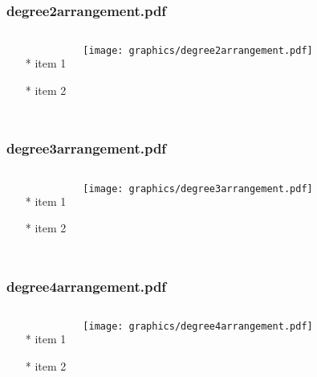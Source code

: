 \documentclass{beamer}
\begin{document}
\begin{frame} \frametitle{degree2arrangement.pdf}
    \begin{columns}[c]
        \begin{itemize}
            \item[*] item 1
            \item[*] item 2
        \end{itemize}
        \begin{minipage}{\linewidth}
            \begin{center}
            \texttt{[image: graphics/degree2arrangement.pdf]}
            \label{gfx:degree2arrangement.pdf}
            \end{center}
        \end{minipage}
    \end{columns}
\end{frame}
\begin{frame} \frametitle{degree3arrangement.pdf}
    \begin{columns}[c]
        \begin{itemize}
            \item[*] item 1
            \item[*] item 2
        \end{itemize}
        \begin{minipage}{\linewidth}
            \begin{center}
            \texttt{[image: graphics/degree3arrangement.pdf]}
            \label{gfx:degree3arrangement.pdf}
            \end{center}
        \end{minipage}
    \end{columns}
\end{frame}
\begin{frame} \frametitle{degree4arrangement.pdf}
    \begin{columns}[c]
        \begin{itemize}
            \item[*] item 1
            \item[*] item 2
        \end{itemize}
        \begin{minipage}{\linewidth}
            \begin{center}
            \texttt{[image: graphics/degree4arrangement.pdf]}
            \label{gfx:degree4arrangement.pdf}
            \end{center}
        \end{minipage}
    \end{columns}
\end{frame}
\end{document}
